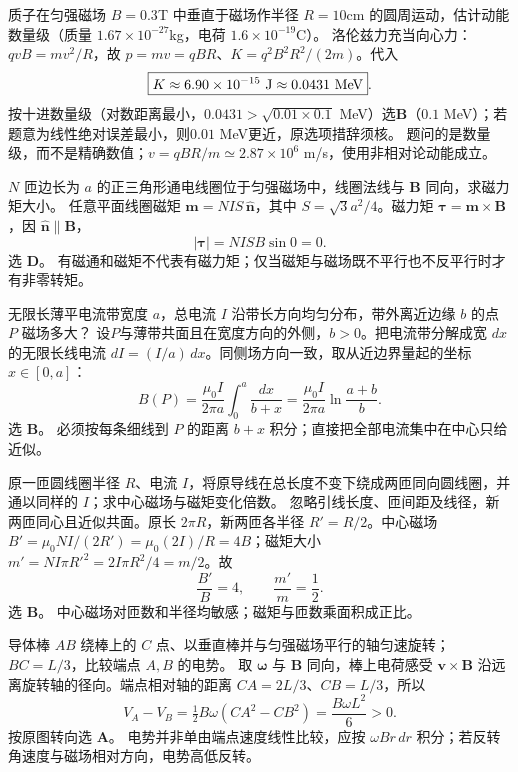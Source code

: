 \problemtext 质子在匀强磁场 $B=0.3$T 中垂直于磁场作半径 $R=10$cm 的圆周运动，估计动能数量级（质量 $1.67\times10^{-27}$kg，电荷 $1.6\times10^{-19}$C）。
\workings 洛伦兹力充当向心力：$qvB=mv^2/R$，故 $p=mv=qBR$、$K=q^2B^2R^2/(2m)$。代入
\[\boxed{K\approx6.90\times10^{-15}\ {\rm J}\approx0.0431\ {\rm MeV}}.\]
按十进数量级（对数距离最小，$0.0431>\sqrt{0.01\times0.1}$ MeV）选\textbf{B}（$0.1$ MeV）；若题意为线性绝对误差最小，则$0.01$ MeV更近，原选项措辞须核。
\crosscheck 题问的是数量级，而不是精确数值；$v=qBR/m\simeq2.87\times10^6$ m/s，使用非相对论动能成立。

\problemtext $N$ 匝边长为 $a$ 的正三角形通电线圈位于匀强磁场中，线圈法线与 $\bm B$ 同向，求磁力矩大小。
\workings 任意平面线圈磁矩 $\bm m=NI S\,\hat{\bm n}$，其中 $S=\sqrt3 a^2/4$。磁力矩 $\bm\tau=\bm m\times\bm B$，因 $\hat{\bm n}\parallel\bm B$，
\[\boxed{|\bm\tau|=NISB\sin0=0}.\]
选 \textbf{D}。
\crosscheck 有磁通和磁矩不代表有磁力矩；仅当磁矩与磁场既不平行也不反平行时才有非零转矩。

\problemtext 无限长薄平电流带宽度 $a$，总电流 $I$ 沿带长方向均匀分布，带外离近边缘 $b$ 的点 $P$ 磁场多大？
\workings 设$P$与薄带共面且在宽度方向的外侧，$b>0$。把电流带分解成宽 $dx$ 的无限长线电流 $dI=(I/a)\,dx$。同侧场方向一致，取从近边界量起的坐标 $x\in[0,a]$：
\[B(P)=\frac{\mu_0 I}{2\pi a}\int_0^a\frac{dx}{b+x}
=\boxed{\frac{\mu_0 I}{2\pi a}\ln\frac{a+b}{b}}.\]
选 \textbf{B}。
\crosscheck 必须按每条细线到 $P$ 的距离 $b+x$ 积分；直接把全部电流集中在中心只给近似。

\problemtext 原一匝圆线圈半径 $R$、电流 $I$，将原导线在总长度不变下绕成两匝同向圆线圈，并通以同样的 $I$；求中心磁场与磁矩变化倍数。
\workings 忽略引线长度、匝间距及线径，新两匝同心且近似共面。原长 $2\pi R$，新两匝各半径 $R'=R/2$。中心磁场 $B'=\mu_0NI/(2R')=\mu_0(2I)/R=4B$；磁矩大小 $m'=NI\pi R'^2=2I\pi R^2/4=m/2$。故
\[\boxed{\frac{B'}B=4,\qquad \frac{m'}m=\frac12}.\]
选 \textbf{B}。
\crosscheck 中心磁场对匝数和半径均敏感；磁矩与匝数乘面积成正比。

\problemtext 导体棒 $AB$ 绕棒上的 $C$ 点、以垂直棒并与匀强磁场平行的轴匀速旋转；$BC=L/3$，比较端点 $A,B$ 的电势。
\workings 取 $\bm\omega$ 与 $\bm B$ 同向，棒上电荷感受 $\bm v\times\bm B$ 沿远离旋转轴的径向。端点相对轴的距离 $CA=2L/3$、$CB=L/3$，所以
\[\boxed{V_A-V_B=\tfrac12B\omega(CA^2-CB^2)=\frac{B\omega L^2}{6}>0}.\]
按原图转向选 \textbf{A}。
\crosscheck 电势并非单由端点速度线性比较，应按 $\omega Br\,dr$ 积分；若反转角速度与磁场相对方向，电势高低反转。

